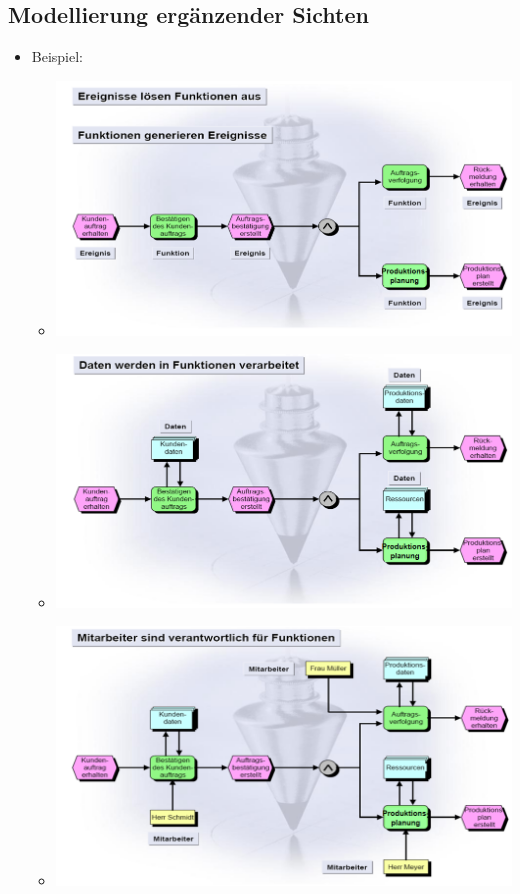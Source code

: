 \documentclass[11pt,a4paper]{article}
\begin{document}
\subsection{Modellierung ergänzender Sichten}
\begin{itemize}
	\item Beispiel:
		\begin{itemize}
		\item[] \includegraphics[width=15cm]{eepk1}
		\item[] \includegraphics[width=15cm]{eepk2}
		\item[] \includegraphics[width=15cm]{eepk3}

\end{itemize}
\end{itemize}
\end{document}
